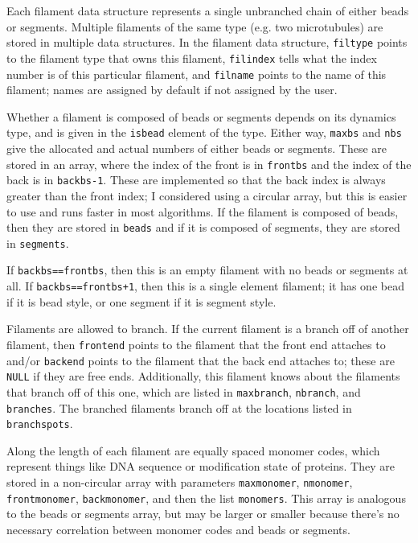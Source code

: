 \documentclass {scrbook}
\newcommand {\ttt} {\texttt}
\begin{document}
Each filament data structure represents a single unbranched chain of either beads or segments. Multiple filaments of the same type (e.g. two microtubules) are stored in multiple data structures. In the filament data structure, \ttt{filtype} points to the filament type that owns this filament, \ttt{filindex} tells what the index number is of this particular filament, and \ttt{filname} points to the name of this filament; names are assigned by default if not assigned by the user.

Whether a filament is composed of beads or segments depends on its dynamics type, and is given in the \ttt{isbead} element of the type. Either way, \ttt{maxbs} and \ttt{nbs} give the allocated and actual numbers of either beads or segments. These are stored in an array, where the index of the front is in \ttt{frontbs} and the index of the back is in \ttt{backbs-1}. These are implemented so that the back index is always greater than the front index; I considered using a circular array, but this is easier to use and runs faster in most algorithms. If the filament is composed of beads, then they are stored in \ttt{beads} and if it is composed of segments, they are stored in \ttt{segments}.

If \ttt{backbs==frontbs}, then this is an empty filament with no beads or segments at all. If \ttt{backbs==frontbs+1}, then this is a single element filament; it has one bead if it is bead style, or one segment if it is segment style.

Filaments are allowed to branch. If the current filament is a branch off of another filament, then \ttt{frontend} points to the filament that the front end attaches to and/or \ttt{backend} points to the filament that the back end attaches to; these are \ttt{NULL} if they are free ends. Additionally, this filament knows about the filaments that branch off of this one, which are listed in \ttt{maxbranch}, \ttt{nbranch}, and \ttt{branches}. The branched filaments branch off at the locations listed in \ttt{branchspots}.

Along the length of each filament are equally spaced monomer codes, which represent things like DNA sequence or modification state of proteins. They are stored in a non-circular array with parameters \ttt{maxmonomer}, \ttt{nmonomer}, \ttt{frontmonomer}, \ttt{backmonomer}, and then the list \ttt{monomers}. This array is analogous to the beads or segments array, but may be larger or smaller because there's no necessary correlation between monomer codes and beads or segments.\\
\end{document}
